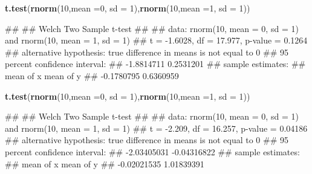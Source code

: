 \documentclass[
]{book}
\newenvironment{Shaded}{\begin{snugshade}}{\end{snugshade}}
\newcommand{\AttributeTok}[1]{\textcolor[rgb]{0.13,0.29,0.53}{#1}}
\newcommand{\DecValTok}[1]{\textcolor[rgb]{0.00,0.00,0.81}{#1}}
\newcommand{\FunctionTok}[1]{\textcolor[rgb]{0.13,0.29,0.53}{\textbf{#1}}}
\newcommand{\NormalTok}[1]{#1}
\begin{document}
\begin{Shaded}
\begin{Highlighting}[]
\FunctionTok{t.test}\NormalTok{(}\FunctionTok{rnorm}\NormalTok{(}\DecValTok{10}\NormalTok{,}\AttributeTok{mean =}\DecValTok{0}\NormalTok{, }\AttributeTok{sd =} \DecValTok{1}\NormalTok{),}\FunctionTok{rnorm}\NormalTok{(}\DecValTok{10}\NormalTok{,}\AttributeTok{mean =}\DecValTok{1}\NormalTok{, }\AttributeTok{sd =} \DecValTok{1}\NormalTok{))}
\end{Highlighting}
\end{Shaded}

\begin{Shaded}
\begin{Highlighting}[]
\NormalTok{\#\# }
\NormalTok{\#\#  Welch Two Sample t{-}test}
\NormalTok{\#\# }
\NormalTok{\#\# data:  rnorm(10, mean = 0, sd = 1) and rnorm(10, mean = 1, sd = 1)}
\NormalTok{\#\# t = {-}1.6028, df = 17.977, p{-}value = 0.1264}
\NormalTok{\#\# alternative hypothesis: true difference in means is not equal to 0}
\NormalTok{\#\# 95 percent confidence interval:}
\NormalTok{\#\#  {-}1.8814711  0.2531201}
\NormalTok{\#\# sample estimates:}
\NormalTok{\#\#  mean of x  mean of y }
\NormalTok{\#\# {-}0.1780795  0.6360959}
\end{Highlighting}
\end{Shaded}

\begin{Shaded}
\begin{Highlighting}[]
\FunctionTok{t.test}\NormalTok{(}\FunctionTok{rnorm}\NormalTok{(}\DecValTok{10}\NormalTok{,}\AttributeTok{mean =}\DecValTok{0}\NormalTok{, }\AttributeTok{sd =} \DecValTok{1}\NormalTok{),}\FunctionTok{rnorm}\NormalTok{(}\DecValTok{10}\NormalTok{,}\AttributeTok{mean =}\DecValTok{1}\NormalTok{, }\AttributeTok{sd =} \DecValTok{1}\NormalTok{))}
\end{Highlighting}
\end{Shaded}

\begin{Shaded}
\begin{Highlighting}[]
\NormalTok{\#\# }
\NormalTok{\#\#  Welch Two Sample t{-}test}
\NormalTok{\#\# }
\NormalTok{\#\# data:  rnorm(10, mean = 0, sd = 1) and rnorm(10, mean = 1, sd = 1)}
\NormalTok{\#\# t = {-}2.209, df = 16.257, p{-}value = 0.04186}
\NormalTok{\#\# alternative hypothesis: true difference in means is not equal to 0}
\NormalTok{\#\# 95 percent confidence interval:}
\NormalTok{\#\#  {-}2.03405031 {-}0.04316822}
\NormalTok{\#\# sample estimates:}
\NormalTok{\#\#   mean of x   mean of y }
\NormalTok{\#\# {-}0.02021535  1.01839391}
\end{Highlighting}
\end{Shaded}
\end{document}
